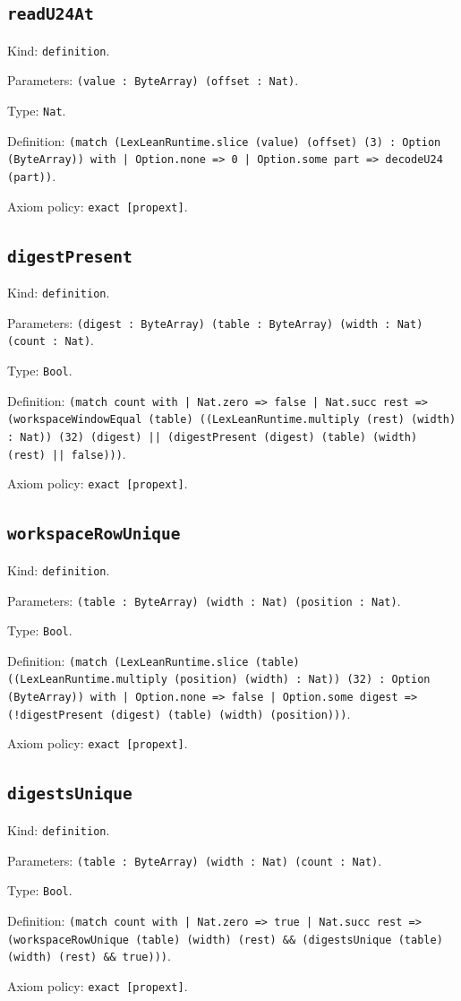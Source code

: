 \documentclass[11pt]{article}
\begin{document}
\subsection*{\texttt{readU24At}}
\noindent Kind: \texttt{definition}.\par
\noindent Parameters: \texttt{(value : ByteArray) (offset : Nat)}.\par
\noindent Type: \texttt{Nat}.\par
\noindent Definition: \texttt{(match (LexLeanRuntime.slice (value) (offset) (3) : Option (ByteArray)) with | Option.none => 0 | Option.some part => decodeU24 (part))}.\par
\noindent Axiom policy: \texttt{exact [propext]}.\par
\subsection*{\texttt{digestPresent}}
\noindent Kind: \texttt{definition}.\par
\noindent Parameters: \texttt{(digest : ByteArray) (table : ByteArray) (width : Nat) (count : Nat)}.\par
\noindent Type: \texttt{Bool}.\par
\noindent Definition: \texttt{(match count with | Nat.zero => false | Nat.succ rest => (workspaceWindowEqual (table) ((LexLeanRuntime.multiply (rest) (width) : Nat)) (32) (digest) || (digestPresent (digest) (table) (width) (rest) || false)))}.\par
\noindent Axiom policy: \texttt{exact [propext]}.\par
\subsection*{\texttt{workspaceRowUnique}}
\noindent Kind: \texttt{definition}.\par
\noindent Parameters: \texttt{(table : ByteArray) (width : Nat) (position : Nat)}.\par
\noindent Type: \texttt{Bool}.\par
\noindent Definition: \texttt{(match (LexLeanRuntime.slice (table) ((LexLeanRuntime.multiply (position) (width) : Nat)) (32) : Option (ByteArray)) with | Option.none => false | Option.some digest => (!digestPresent (digest) (table) (width) (position)))}.\par
\noindent Axiom policy: \texttt{exact [propext]}.\par
\subsection*{\texttt{digestsUnique}}
\noindent Kind: \texttt{definition}.\par
\noindent Parameters: \texttt{(table : ByteArray) (width : Nat) (count : Nat)}.\par
\noindent Type: \texttt{Bool}.\par
\noindent Definition: \texttt{(match count with | Nat.zero => true | Nat.succ rest => (workspaceRowUnique (table) (width) (rest) \&\& (digestsUnique (table) (width) (rest) \&\& true)))}.\par
\noindent Axiom policy: \texttt{exact [propext]}.\par
\end{document}
